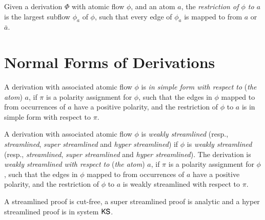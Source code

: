 \begin{definition}\label{definiton:FlowRestriction}
Given a derivation $\Phi$ with atomic flow $\phi$, and an atom $a$, the \emph{restriction of $\phi$ to $a$} is the largest subflow $\phi_a$ of $\phi$, such that every edge of $\phi_a$ is mapped to from $a$ or $\bar a$.
\end{definition}

\section{Normal Forms of Derivations}\label{section:DerNormalForm}


\begin{definition}\label{definition:DerSimpleForm}
A derivation with associated atomic flow $\phi$ is \emph{in simple form with respect to} (\emph{the atom}) $a$, if $\pi$ is a polarity assignment for $\phi$, such that the edges in $\phi$ mapped to from occurrences of $a$ have a positive polarity, and the restriction of $\phi$ to $a$ is in simple form with respect to $\pi$.
\end{definition}

\begin{definition}\label{definition:DerStreamlined}
A derivation with associated atomic flow $\phi$ is \emph{weakly streamlined} (resp., \emph{streamlined}, \emph{super streamlined} and \emph{hyper streamlined}) if $\phi$ is \emph{weakly streamlined} (resp., \emph{streamlined}, \emph{super streamlined} and \emph{hyper streamlined}). The derivation is \emph{weakly streamlined with respect to} (\emph{the atom}) $a$, if $\pi$ is a polarity assignment for $\phi$, such that the edges in $\phi$ mapped to from occurrences of $a$ have a positive polarity, and the restriction of $\phi$ to $a$ is weakly streamlined with respect to $\pi$.
\end{definition}


\begin{remark}\label{remark:DerCutFree}
A streamlined proof is cut-free, a super streamlined proof is analytic and a hyper streamlined proof is in system $\mathsf{KS}$.
\end{remark}

